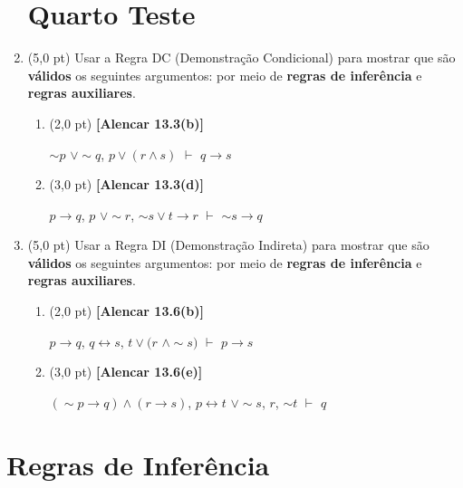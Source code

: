 \documentclass[12pt,a4paper,oneside]{article}
\begin{document}
\begin{enumerate}
	
	\section*{Quarto Teste}
	
	\item (5,0 pt) Usar a Regra DC (Demonstração Condicional) para mostrar que são {\bf válidos} os seguintes argumentos: por meio de {\bf regras de inferência} e {\bf regras auxiliares}.
	\begin{enumerate}
		\item (2,0 pt) {\bf [Alencar 13.3(b)]} 
		\begin{center}
			$\sim p$ $\vee \sim q$, $p \vee (r \wedge s)$ $\vdash$ $q \rightarrow s$
		\end{center}
		
		
		\item (3,0 pt) {\bf [Alencar 13.3(d)]} 
		\begin{center}
			$p \rightarrow q$, $p$ $\vee \sim r$, $\sim s \vee t \rightarrow r$ $\vdash$ $\sim s \rightarrow q$
		\end{center}
		
	\end{enumerate}
	
	\item (5,0 pt) Usar a Regra DI (Demonstração Indireta) para mostrar que são {\bf válidos} os seguintes argumentos: por meio de {\bf regras de inferência} e {\bf regras auxiliares}.
	\begin{enumerate}
		\item (2,0 pt) {\bf [Alencar 13.6(b)]} 
		\begin{center}
			$p \rightarrow q$, $q \leftrightarrow s$, $t \vee (r$ $\wedge \sim s)$ $\vdash$ $p \rightarrow s$
		\end{center}
		
		\item (3,0 pt) {\bf [Alencar 13.6(e)]} 
		\begin{center}
			$(\sim p \rightarrow q) \wedge (r \rightarrow s)$, $p \leftrightarrow t$ $\vee \sim s$, $r$, $\sim t$ $\vdash$ $q$
		\end{center}
		
	\end{enumerate}

\end{enumerate}

\newpage

\section*{Regras de Inferência}
\end{document}
